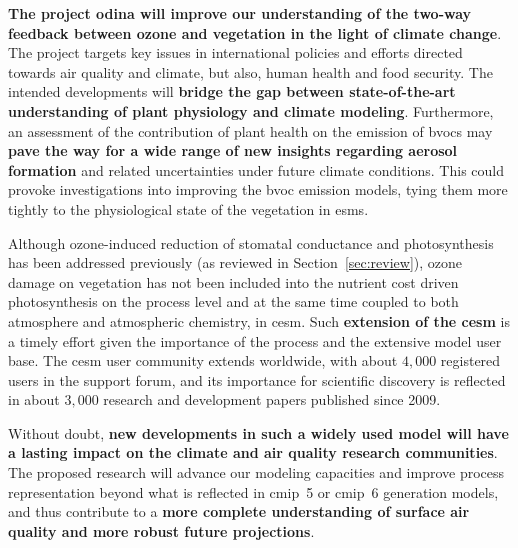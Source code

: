 \textbf{The project \gls{odina} will improve our understanding of the two-way feedback between ozone and vegetation in the light of climate change}. The project targets key issues in international policies and efforts directed towards air quality and climate, but also, human health and food security.
The intended developments will \textbf{bridge the gap between state-of-the-art understanding of plant physiology and climate modeling}. 
Furthermore, an assessment of the contribution of plant health on the emission of \glspl{bvoc} may \textbf{pave the way for a wide range of new insights regarding aerosol formation} and related uncertainties under future climate conditions. This could provoke investigations into improving the \gls{bvoc} emission models, tying them more tightly to the physiological state of the vegetation in \glspl{esm}.

Although ozone-induced reduction of stomatal conductance and photosynthesis has been addressed previously (as reviewed in Section~\ref{sec:review}), ozone damage on vegetation has not been included into the nutrient cost driven photosynthesis on the process level and at the same time coupled to both atmosphere and atmospheric chemistry, in \gls{cesm}.
Such \textbf{extension of the \gls{cesm}} is a timely effort given the importance of the process and the extensive model user base. The \gls{cesm} user community extends worldwide, with about $4,000$ registered users in the support forum, and its importance for scientific discovery is reflected in about $3,000$ research and development papers published since 2009.

Without doubt, \textbf{new developments in such a widely used model will have a lasting impact on the climate and air quality research communities}. The proposed research will advance our modeling capacities and improve process representation beyond what is reflected in \gls{cmip}~5 or \gls{cmip}~6 generation models, and thus contribute to a \textbf{more complete understanding of surface air quality and more robust future projections}.

